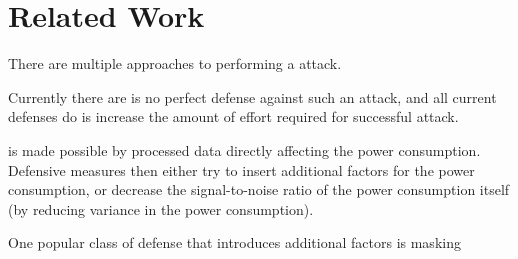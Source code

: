 \section{Related Work}
There are multiple approaches to performing a \poweranalysis{} attack.

Currently there are is no perfect defense against such an attack, and all current defenses do is increase the amount of effort required for successful attack.

\poweranalysis{} is made possible by processed data directly affecting the power consumption.
Defensive measures then either try to insert additional factors for the power consumption, or decrease the signal-to-noise ratio of the power consumption itself (by reducing variance in the power consumption).

One popular class of defense that introduces additional factors is masking
